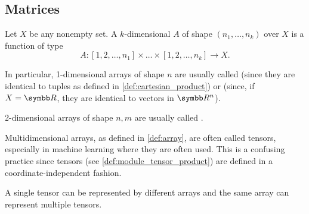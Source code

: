 \subsection{Matrices}\label{subsec:matrices}

\begin{definition}\label{def:array}
  Let \( X \) be any nonempty set. A \( k \)-dimensional  \( A \) of shape \( (n_1, \ldots, n_k) \) over \( X \) is a function of type
  \begin{equation*}
    A: [1, 2, \ldots, n_1] \times \ldots \times [1, 2, \ldots, n_k] \to X.
  \end{equation*}

  In particular, 1-dimensional arrays of shape \( n \) are usually called  (since they are identical to tuples as defined in \cref{def:cartesian_product}) or  (since, if \( X = \R \), they are identical to vectors in \( \R^n \)).

  2-dimensional arrays of shape \( n, m \) are usually called .
\end{definition}

\begin{remark}\label{remark:arrays_vs_tensors}
  Multidimensional arrays, as defined in \cref{def:array}, are often called tensors, especially in machine learning where they are often used. This is a confusing practice since tensors (see \cref{def:module_tensor_product}) are defined in a coordinate-independent fashion.

  A single tensor can be represented by different arrays and the same array can represent multiple tensors.
\end{remark}
